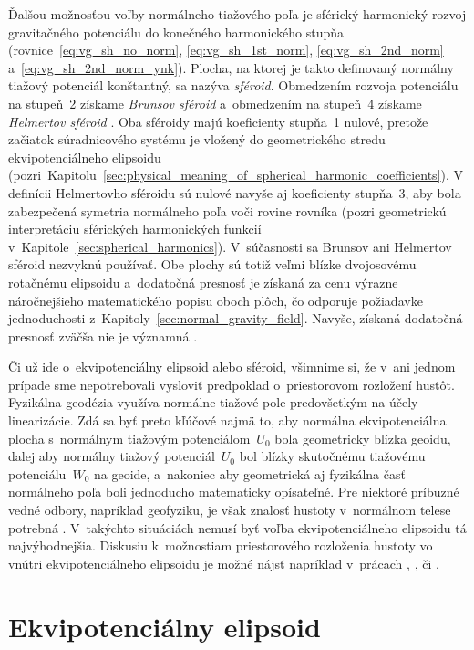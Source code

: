 \documentclass[a4paper,12pt]{book}
\begin{document}
Ďalšou možnosťou voľby normálneho tiažového poľa je sférický harmonický rozvoj 
gravitačného potenciálu do konečného harmonického stupňa 
(rovnice~\ref{eq:vg_sh_no_norm}, \ref{eq:vg_sh_1st_norm}, 
\ref{eq:vg_sh_2nd_norm} a~\ref{eq:vg_sh_2nd_norm_ynk}).  Plocha, na ktorej je 
takto definovaný normálny tiažový potenciál konštantný, sa nazýva 
\emph{sféroid}.  Obmedzením rozvoja potenciálu na stupeň~2 získame 
\emph{Brunsov sféroid} a~obmedzením na stupeň~4 získame \emph{Helmertov 
sféroid} \parencite{Moritz1967}.  Oba sféroidy majú koeficienty stupňa~1 
nulové, pretože začiatok súradnicového systému je vložený do geometrického 
stredu ekvipotenciálneho elipsoidu 
(pozri~Kapitolu~\ref{sec:physical_meaning_of_spherical_harmonic_coefficients}).  
V definícii Helmertovho sféroidu sú nulové navyše aj koeficienty stupňa~3, aby 
bola zabezpečená symetria normálneho poľa voči rovine rovníka (pozri 
geometrickú interpretáciu sférických harmonických funkcií 
v~Kapitole~\ref{sec:spherical_harmonics}).   V~súčasnosti sa Brunsov ani 
Helmertov sféroid nezvyknú používať.  Obe plochy sú totiž veľmi blízke 
dvojosovému rotačnému elipsoidu a~dodatočná presnosť je získaná za cenu výrazne 
náročnejšieho matematického popisu oboch plôch, čo odporuje požiadavke 
jednoduchosti z~Kapitoly~\ref{sec:normal_gravity_field}.  Navyše, získaná 
dodatočná presnosť zväčša nie je významná \parencite{Moritz1967}.

Či už ide o~ekvipotenciálny elipsoid alebo sféroid, všimnime si, že v~ani 
jednom prípade sme nepotrebovali vysloviť predpoklad o~priestorovom rozložení 
hustôt.  Fyzikálna geodézia využíva normálne tiažové pole predovšetkým na účely 
linearizácie.  Zdá sa byť preto kľúčové najmä to, aby normálna ekvipotenciálna 
plocha s~normálnym tiažovým potenciálom~$U_0$ bola geometricky blízka geoidu, 
ďalej aby normálny tiažový potenciál~$U_0$ bol blízky skutočnému tiažovému 
potenciálu~$W_0$ na geoide, a~nakoniec aby geometrická aj fyzikálna časť 
normálneho poľa boli jednoducho matematicky opísateľné.  Pre niektoré príbuzné 
vedné odbory, napríklad geofyziku, je však znalosť hustoty v~normálnom telese 
potrebná \parencite{Karcol2017}.  V~takýchto situáciách nemusí byť voľba 
ekvipotenciálneho elipsoidu tá najvýhodnejšia.  Diskusiu k~možnostiam 
priestorového rozloženia hustoty vo vnútri ekvipotenciálneho elipsoidu je možné 
nájsť napríklad v~prácach \textcite{MoritzTheFigureOfTheEarth}, 
\textcite{TorgeGeodesy}, \textcite{Conway2000} či \textcite{Karcol2017}.



\section{Ekvipotenciálny elipsoid}
\label{sec:equipotential_ellipsoid}
\end{document}
